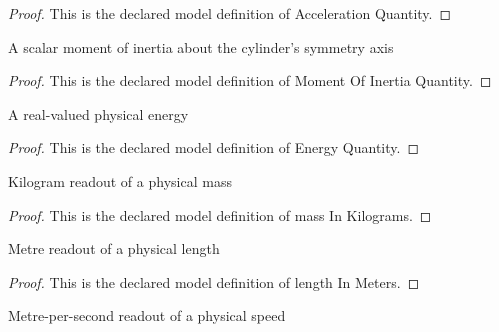 \begin{proof}
  This is the declared model definition of Acceleration Quantity.
\end{proof}
\begin{definition}
  \label{def:physics:phyx-mini-0780:phyxminiproblems-problemphyxmini0780-momentofinertiaquantity}
  A scalar moment of inertia about the cylinder's symmetry axis
\end{definition}
\begin{proof}
  This is the declared model definition of Moment Of Inertia Quantity.
\end{proof}
\begin{definition}
  \label{def:physics:phyx-mini-0780:phyxminiproblems-problemphyxmini0780-energyquantity}
  A real-valued physical energy
\end{definition}
\begin{proof}
  This is the declared model definition of Energy Quantity.
\end{proof}
\begin{definition}
  \label{def:physics:phyx-mini-0780:phyxminiproblems-problemphyxmini0780-massinkilograms}
  Kilogram readout of a physical mass
\end{definition}
\begin{proof}
  This is the declared model definition of mass In Kilograms.
\end{proof}
\begin{definition}
  \label{def:physics:phyx-mini-0780:phyxminiproblems-problemphyxmini0780-lengthinmeters}
  Metre readout of a physical length
\end{definition}
\begin{proof}
  This is the declared model definition of length In Meters.
\end{proof}
\begin{definition}
  \label{def:physics:phyx-mini-0780:phyxminiproblems-problemphyxmini0780-speedinmeterspersecond}
  Metre-per-second readout of a physical speed
\end{definition}
